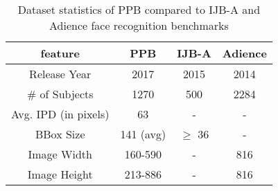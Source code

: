 \begin{table}[b]
    \caption{Dataset statistics of PPB compared to IJB-A and Adience face recognition benchmarks}
    \label{ppb}
    \centering
    \begin{tabular}{cccc}
        
        \hline
        feature & PPB & IJB-A & Adience \\
        \hline
        Release Year & 2017 & 2015 & 2014 \\
        \# of Subjects & 1270 & 500 & 2284 \\
        Avg. IPD (in pixels) & 63 & - & - \\
        BBox Size & 141 (avg) & $\geq$ 36 & - \\
        Image Width & 160-590 & - & 816 \\
        Image Height & 213-886 & - & 816 \\      
        \hline
    \end{tabular}
\end{table}
